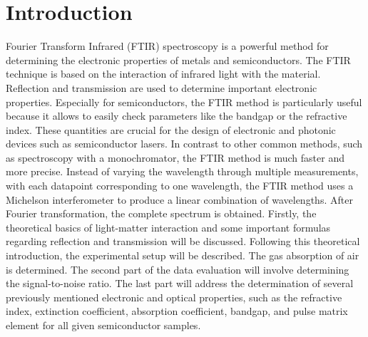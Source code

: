 \section{Introduction}
Fourier Transform Infrared (FTIR) spectroscopy is a powerful method for determining
the electronic properties of metals and semiconductors. The FTIR technique is based on the
interaction of infrared light with the material. Reflection and transmission are used to determine 
important electronic properties. Especially for semiconductors, the FTIR method
is particularly useful because it allows to easily check parameters like the bandgap or the refractive index.
These quantities are crucial for the design of electronic and photonic devices such as semiconductor lasers. 
In contrast to other common methods, such as spectroscopy with
a monochromator, the FTIR method is much faster and more precise. Instead of varying the wavelength
through multiple measurements, with each datapoint corresponding to one wavelength, the FTIR method uses a Michelson interferometer 
to produce a linear combination of wavelengths.
After Fourier transformation, the complete spectrum is obtained.
Firstly, the theoretical basics of light-matter interaction and some important formulas regarding
reflection and transmission will be discussed. Following this theoretical introduction, the experimental
setup will be described. The gas absorption of air is determined. The second part of the data evaluation will involve determining the signal-to-noise
ratio. The last part will address the determination of several previously mentioned electronic and optical properties,
such as the refractive index, extinction coefficient, absorption coefficient, bandgap, and pulse matrix element
for all given semiconductor samples.